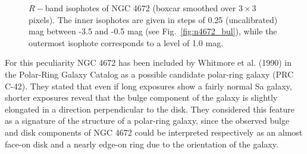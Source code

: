\documentclass[twocolumns]{aa}
\begin{document}
\begin{figure}[ht]
\vspace*{9cm}
\caption[]{$R-$band isophotes of NGC 4672 (boxcar smoothed over $3\times3$
  pixels). The inner isophotes are given in steps of 0.25 (uncalibrated) mag
  between -3.5 and -0.5 mag (see Fig.~\ref{fig:n4672_bul}), 
  while the outermost isophote corresponds to a level of 1.0 mag.} 
\label{fig:n4672_cont}
\end{figure}

For this peculiarity NGC 4672 has been included by Whitmore et
al. (1990) in the Polar-Ring Galaxy Catalog as a possible 
candidate polar-ring galaxy (PRC C-42). They stated that even if long
exposures show a fairly normal Sa galaxy, shorter exposures reveal
that the bulge component of the galaxy is slightly elongated in a
direction perpendicular to the disk. They considered this feature as a
signature of the structure of a polar-ring galaxy, since the observed
bulge and disk components of NGC 4672 could be interpreted
respectively as an almost face-on disk and a nearly edge-on ring
due to the orientation of the galaxy.
\end{document}
